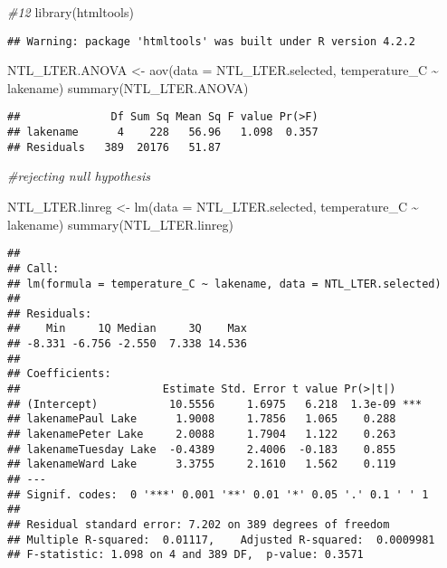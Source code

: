\documentclass[
]{article}
\newenvironment{Shaded}{\begin{snugshade}}{\end{snugshade}}
\newcommand{\AttributeTok}[1]{\textcolor[rgb]{0.77,0.63,0.00}{#1}}
\newcommand{\CommentTok}[1]{\textcolor[rgb]{0.56,0.35,0.01}{\textit{#1}}}
\newcommand{\FunctionTok}[1]{\textcolor[rgb]{0.00,0.00,0.00}{#1}}
\newcommand{\NormalTok}[1]{#1}
\newcommand{\OtherTok}[1]{\textcolor[rgb]{0.56,0.35,0.01}{#1}}
\newcommand{\SpecialCharTok}[1]{\textcolor[rgb]{0.00,0.00,0.00}{#1}}
\begin{document}
\begin{Shaded}
\begin{Highlighting}[]
\CommentTok{\#12}
\FunctionTok{library}\NormalTok{(htmltools)}
\end{Highlighting}
\end{Shaded}

\begin{verbatim}
## Warning: package 'htmltools' was built under R version 4.2.2
\end{verbatim}

\begin{Shaded}
\begin{Highlighting}[]
\NormalTok{NTL\_LTER.ANOVA }\OtherTok{\textless{}{-}} \FunctionTok{aov}\NormalTok{(}\AttributeTok{data =}\NormalTok{ NTL\_LTER.selected, temperature\_C }\SpecialCharTok{\textasciitilde{}}\NormalTok{ lakename)}
\FunctionTok{summary}\NormalTok{(NTL\_LTER.ANOVA)}
\end{Highlighting}
\end{Shaded}

\begin{verbatim}
##              Df Sum Sq Mean Sq F value Pr(>F)
## lakename      4    228   56.96   1.098  0.357
## Residuals   389  20176   51.87
\end{verbatim}

\begin{Shaded}
\begin{Highlighting}[]
\CommentTok{\#rejecting null hypothesis}

\NormalTok{NTL\_LTER.linreg }\OtherTok{\textless{}{-}} \FunctionTok{lm}\NormalTok{(}\AttributeTok{data =}\NormalTok{ NTL\_LTER.selected, temperature\_C }\SpecialCharTok{\textasciitilde{}}\NormalTok{ lakename)}
\FunctionTok{summary}\NormalTok{(NTL\_LTER.linreg)}
\end{Highlighting}
\end{Shaded}

\begin{verbatim}
## 
## Call:
## lm(formula = temperature_C ~ lakename, data = NTL_LTER.selected)
## 
## Residuals:
##    Min     1Q Median     3Q    Max 
## -8.331 -6.756 -2.550  7.338 14.536 
## 
## Coefficients:
##                      Estimate Std. Error t value Pr(>|t|)    
## (Intercept)           10.5556     1.6975   6.218  1.3e-09 ***
## lakenamePaul Lake      1.9008     1.7856   1.065    0.288    
## lakenamePeter Lake     2.0088     1.7904   1.122    0.263    
## lakenameTuesday Lake  -0.4389     2.4006  -0.183    0.855    
## lakenameWard Lake      3.3755     2.1610   1.562    0.119    
## ---
## Signif. codes:  0 '***' 0.001 '**' 0.01 '*' 0.05 '.' 0.1 ' ' 1
## 
## Residual standard error: 7.202 on 389 degrees of freedom
## Multiple R-squared:  0.01117,    Adjusted R-squared:  0.0009981 
## F-statistic: 1.098 on 4 and 389 DF,  p-value: 0.3571
\end{verbatim}
\end{document}
